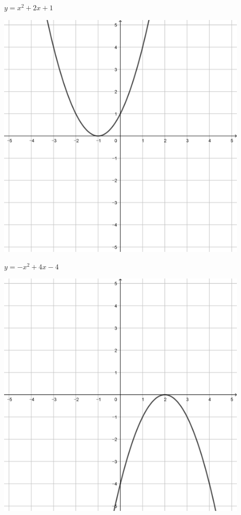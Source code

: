 \documentclass[a4paper]{oblivoir}
\begin{document}
\clearpage
\begin{minipage}{0.45\textwidth}\centering
\(y=x^2+2x+1\)
\par\bigskip\includegraphics[width=0.9\textwidth]{img/10-1}
\end{minipage}
\begin{minipage}{0.45\textwidth}\centering
\(y=-x^2+4x-4\)
\par\bigskip\includegraphics[width=0.9\textwidth]{img/10-2}
\end{minipage}\bigskip\bigskip\par
\end{document}
